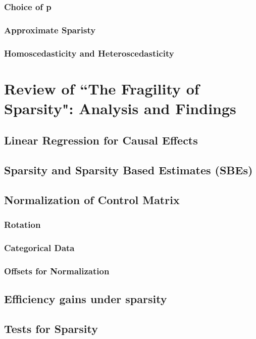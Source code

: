 \subsubsection{Choice of p}

\subsubsection{Approximate Sparisty}

\subsubsection{Homoscedasticity and Heteroscedasticity}


\section{Review of ``The Fragility of Sparsity": Analysis and Findings}
\subsection{Linear Regression for Causal Effects}

\subsection{Sparsity and Sparsity Based Estimates (SBEs)}

\subsection{Normalization of Control Matrix}

\subsubsection{Rotation}

\subsubsection{Categorical Data}

\subsubsection{Offsets for Normalization}

\subsection{Efficiency gains under sparsity}


\subsection{Tests for Sparsity}


